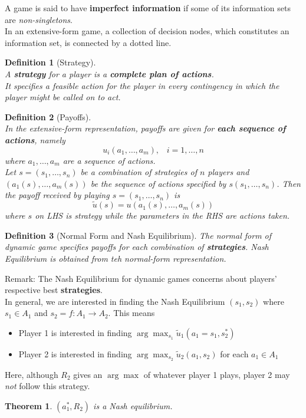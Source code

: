 \documentclass[12pt]{article}
\newtheorem{definition}{Definition}[section]
\newtheorem{theorem}{Theorem}[section]
\theoremstyle{definition}
\begin{document}
A game is said to have \textbf{imperfect information} if some of its information sets are \textit{non-singletons}.\\
In an extensive-form game, a collection of decision nodes, which constitutes an information set, is connected by a dotted line.
\begin{definition}[Strategy]
\hfill\\\normalfont A \textbf{strategy} for a player is a \textbf{complete plan of actions}.\\
It specifies a feasible action for the player in every contingency in which the player might be called on to act. 
\end{definition}
\begin{definition}[Payoffs]
\hfill\\\normalfont In the extensive-form representation, payoffs are given for \textbf{each sequence of actions}, namely
\[
u_i(a_1,\ldots, a_m), \;\;\;i=1,\ldots, n
\]
where $a_1,\ldots, a_m$ are a sequence of actions.\\
Let $s=(s_1,\ldots, s_n)$ be a combination of strategies of $n$ players and $(a_1(s), \ldots, a_m(s))$ be the sequence of actions specified by $s(s_1,\ldots, s_n)$. Then the payoff received by playing $s=(s_1,\ldots, s_n)$ is
\[
\tilde{u}(s)=u(a_1(s), \ldots, a_m(s))
\]
where $s$ on LHS is strategy while the parameters in the RHS are actions taken.
\end{definition}
\begin{definition}[Normal Form and Nash Equilibrium]
The normal form of dynamic game specifies payoffs for each combination of \textbf{strategies}. Nash Equilibrium is obtained from teh normal-form representation.
\end{definition}
Remark: The Nash Equilibrium for dynamic games concerns about players' respective best \textbf{strategies}.\\
In general, we are interested in finding the Nash Equilibrium $(s_1, s_2)$ where $s_1\in A_1$ and $s_2=f:A_1\to A_2$. This means
\begin{itemize}
  \item Player 1 is interested in finding $\arg\max_{s_1}\tilde{u}_1(a_1=s_1, s_2^\ast)$
  \item Player 2 is interested in finding $\arg\max_{s_2}\tilde{u}_2(a_1, s_2)$ for each $a_1 \in A_1$
\end{itemize}
Here, although $R_2$ gives an $\arg\max$ of whatever player 1 plays, player 2 may \textit{not} follow this strategy.
\begin{theorem}\normalfont $(a_1^\ast, R_2)$ is a Nash equilibrium.
\end{theorem}
\end{document}

